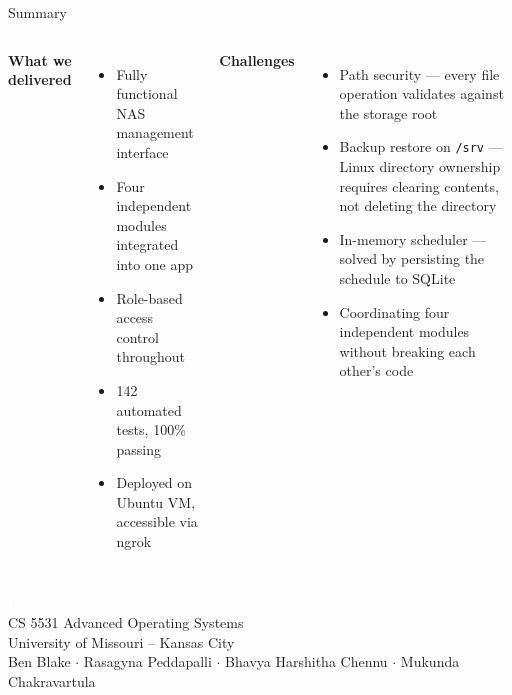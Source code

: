 \documentclass[aspectratio=169]{beamer}
\begin{document}
\begin{frame}{Summary}
  \begin{columns}[T, onlytextwidth]
      \textbf{What we delivered}
      \begin{itemize}
        \item Fully functional NAS management interface
        \item Four independent modules integrated into one app
        \item Role-based access control throughout
        \item 142 automated tests, 100\% passing
        \item Deployed on Ubuntu VM, accessible via ngrok
      \end{itemize}
      \textbf{Challenges}
      \begin{itemize}
        \item Path security --- every file operation validates against the storage root
        \item Backup restore on \texttt{/srv} --- Linux directory ownership requires clearing contents, not deleting the directory
        \item In-memory scheduler --- solved by persisting the schedule to SQLite
        \item Coordinating four independent modules without breaking each other's code
      \end{itemize}
  \end{columns}
\end{frame}

{
\begin{frame}[plain]
  \begin{center}
    \vspace{2em}
    {\Huge \textcolor{white}{\textbf{Questions?}}} \\[1.5em]
    {\large \textcolor{accent}{CS 5531 Advanced Operating Systems}} \\[0.5em]
    {\normalsize \textcolor{textmuted}{University of Missouri -- Kansas City}} \\[1.5em]
    \textcolor{textmuted}{\small
      Ben Blake $\cdot$
      Rasagyna Peddapalli $\cdot$
      Bhavya Harshitha Chennu $\cdot$
      Mukunda Chakravartula
    }
  \end{center}
\end{frame}
}
\end{document}
